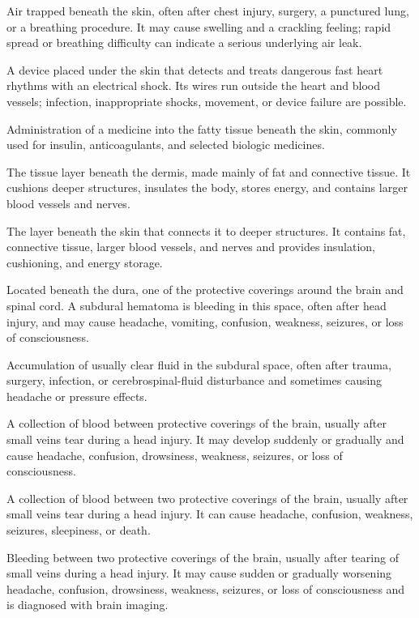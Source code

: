  Air trapped beneath the skin, often after chest injury, surgery, a punctured lung, or a breathing procedure. It may cause swelling and a crackling feeling; rapid spread or breathing difficulty can indicate a serious underlying air leak.

 A device placed under the skin that detects and treats dangerous fast heart rhythms with an electrical shock. Its wires run outside the heart and blood vessels; infection, inappropriate shocks, movement, or device failure are possible.

 Administration of a medicine into the fatty tissue beneath the skin, commonly used for insulin, anticoagulants, and selected biologic medicines.

 The tissue layer beneath the dermis, made mainly of fat and connective tissue. It cushions deeper structures, insulates the body, stores energy, and contains larger blood vessels and nerves.

 The layer beneath the skin that connects it to deeper structures. It contains fat, connective tissue, larger blood vessels, and nerves and provides insulation, cushioning, and energy storage.

 Located beneath the dura, one of the protective coverings around the brain and spinal cord. A subdural hematoma is bleeding in this space, often after head injury, and may cause headache, vomiting, confusion, weakness, seizures, or loss of consciousness.

 Accumulation of usually clear fluid in the subdural space, often after trauma, surgery, infection, or cerebrospinal-fluid disturbance and sometimes causing headache or pressure effects.

 A collection of blood between protective coverings of the brain, usually after small veins tear during a head injury. It may develop suddenly or gradually and cause headache, confusion, drowsiness, weakness, seizures, or loss of consciousness.

 A collection of blood between two protective coverings of the brain, usually after small veins tear during a head injury. It can cause headache, confusion, weakness, seizures, sleepiness, or death.

 Bleeding between two protective coverings of the brain, usually after tearing of small veins during a head injury. It may cause sudden or gradually worsening headache, confusion, drowsiness, weakness, seizures, or loss of consciousness and is diagnosed with brain imaging.

